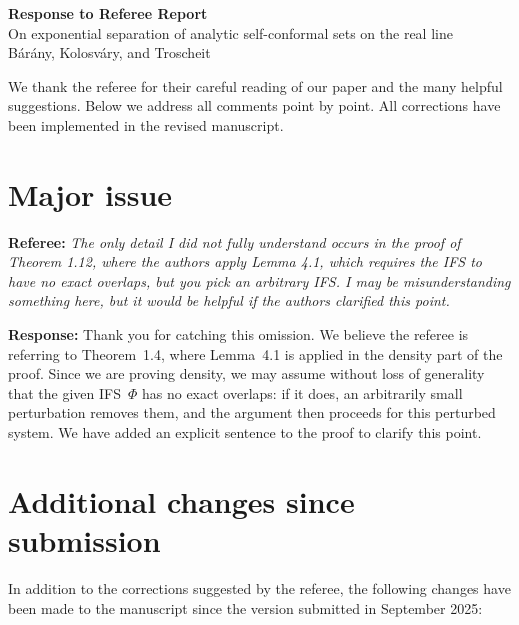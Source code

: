 \documentclass[11pt]{article}
\newcommand{\referee}[1]{\textbf{Referee:} \textit{#1}}
\newcommand{\response}[1]{\textbf{Response:} #1}
\begin{document}
\begin{center}
  {\Large\bfseries Response to Referee Report}\\[6pt]
  {\large On exponential separation of analytic self-conformal sets on the real line}\\[4pt]
  B\'ar\'any, Kolosv\'ary, and Troscheit
\end{center}

\bigskip

\noindent We thank the referee for their careful reading of our paper and the many helpful suggestions.
Below we address all comments point by point.  All corrections have been implemented in the revised manuscript.

\bigskip

\section*{Major issue}

\referee{The only detail I did not fully understand occurs in the proof of Theorem 1.12, where the authors apply Lemma 4.1, which requires the IFS to have no exact overlaps, but you pick an arbitrary IFS. I may be misunderstanding something here, but it would be helpful if the authors clarified this point.}

\response{Thank you for catching this omission. We believe the referee is referring to Theorem~1.4, where Lemma~4.1 is applied in the density part of the proof. Since we are proving density, we may assume without loss of generality that the given IFS~$\Phi$ has no exact overlaps: if it does, an arbitrarily small perturbation removes them, and the argument then proceeds for this perturbed system. We have added an explicit sentence to the proof to clarify this point.}

\section*{Additional changes since submission}

In addition to the corrections suggested by the referee, the following changes have been made to the manuscript since the version submitted in September 2025:
\end{document}
